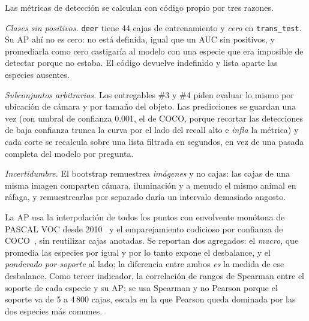 Las métricas de detección se calculan con código propio por tres razones.

\emph{Clases sin positivos.} \texttt{deer} tiene 44 cajas de entrenamiento y
\emph{cero} en \texttt{trans\_test}. Su AP ahí no es cero: no está definida,
igual que un AUC sin positivos, y promediarla como cero castigaría al modelo con
una especie que era imposible de detectar porque no estaba. El código devuelve
indefinido y lista aparte las especies ausentes.

\emph{Subconjuntos arbitrarios.} Los entregables \#3 y \#4 piden evaluar lo
mismo por ubicación de cámara y por tamaño del objeto. Las predicciones se
guardan una vez (con umbral de confianza 0.001, el de COCO, porque recortar las
detecciones de baja confianza trunca la curva por el lado del recall alto e
\emph{infla} la métrica) y cada corte se recalcula sobre una lista filtrada en
segundos, en vez de una pasada completa del modelo por pregunta.

\emph{Incertidumbre.} El bootstrap remuestrea \emph{imágenes} y no cajas: las
cajas de una misma imagen comparten cámara, iluminación y a menudo el mismo
animal en ráfaga, y remuestrearlas por separado daría un intervalo demasiado
angosto.

La AP usa la interpolación de todos los puntos con envolvente monótona de PASCAL
VOC desde 2010~\cite{everingham2010pascal} y el emparejamiento codicioso por
confianza de COCO~\cite{lin2014microsoft}, sin reutilizar cajas anotadas. Se
reportan dos agregados: el \emph{macro}, que promedia las especies por igual y
por lo tanto expone el desbalance, y el \emph{ponderado por soporte} al lado;
la diferencia entre ambos \emph{es} la medida de ese desbalance. Como tercer
indicador, la correlación de rangos de Spearman entre el soporte de cada especie
y su AP; se usa Spearman y no Pearson porque el soporte va de 5 a 4\,800 cajas,
escala en la que Pearson queda dominada por las dos especies más comunes.
